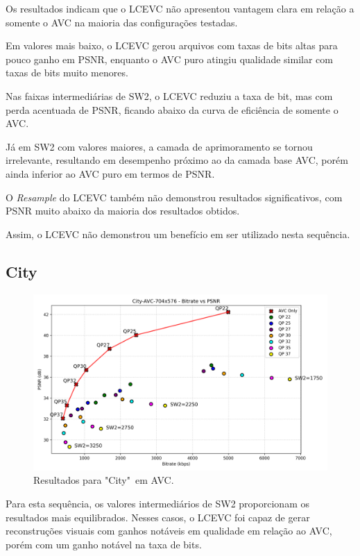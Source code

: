 Os resultados indicam que o \acrshort{LCEVC} não apresentou vantagem clara em relação
a somente o \acrshort{AVC} na maioria das configurações testadas.

Em valores mais baixo, o \acrshort{LCEVC} gerou arquivos com taxas de bits altas
para pouco ganho em \acrshort{PSNR}, enquanto o \acrshort{AVC} puro atingiu qualidade
similar com taxas de bits muito menores.

Nas faixas intermediárias de SW2, o \acrshort{LCEVC} reduziu a taxa de bit, mas
com perda acentuada de \acrshort{PSNR}, ficando abaixo da curva de eficiência de somente
o \acrshort{AVC}.

Já em SW2 com valores maiores, a camada de aprimoramento se tornou irrelevante, resultando em
desempenho próximo ao da camada base \acrshort{AVC}, porém ainda inferior ao \acrshort{AVC} puro
em termos de \acrshort{PSNR}.

O \textit{Resample} do \acrshort{LCEVC} também não demonstrou resultados significativos, com 
\acrshort{PSNR} muito abaixo da maioria dos resultados obtidos. 

Assim, o \acrshort{LCEVC} não demonstrou um benefício em ser utilizado nesta sequência.

\newpage
\subsection{City}

\begin{figure}[h]
    \centering
    \includegraphics[width=1.0\textwidth]{img/City-AVC.png}
    \caption{Resultados para "City"\ em \acrshort{AVC}. \cite{xiph}}
    \label{fig:City}
\end{figure}

Para esta sequência, os valores intermediários de SW2 proporcionam os resultados mais equilibrados.
Nesses casos, o \acrshort{LCEVC} foi capaz de gerar reconstruções visuais com ganhos notáveis
em qualidade em relação ao \acrshort{AVC}, porém com um ganho notável na taxa de bits.

